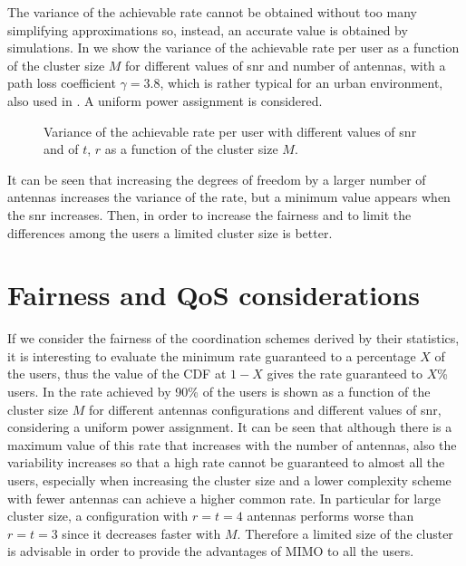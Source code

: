 The variance of the achievable rate cannot be obtained without too many simplifying approximations so, instead, an accurate value is obtained by simulations. In  we show the variance of the achievable rate per user as a function of the cluster size $M$ for different values of \gls{snr} and number of antennas, with a path loss coefficient $\gamma=3.8$, which is rather typical for an urban environment, also used in \cite{karakayali06}. A uniform power assignment is considered. 
\begin{figure}[t]
\begin{center}
\begin{small}
\end{small}
\end{center}
\vspace*{-2.2mm}\caption{Variance of the achievable rate per user with different values of \gls{snr} and of $t$, $r$ as a function of the cluster size $M$.}\label{Varianza}
\end{figure}
It can be seen that increasing the degrees of freedom by a larger number of antennas increases the variance of the rate, but a minimum value appears when the \gls{snr} increases. Then, in order to increase the fairness and to limit the differences among the users a limited cluster size is better.

\section{Fairness and QoS considerations}

If we consider the fairness of the coordination schemes derived by their statistics, it is interesting to evaluate the minimum rate guaranteed to a percentage $X$ of the users, thus the value of the CDF at $1-X$ gives the rate guaranteed to $X$\% users.
In  the rate achieved by 90\% of the users is shown as a function of the cluster size $M$ for different antennas configurations and different values of \gls{snr}, considering a uniform power assignment. It can be seen that although there is a maximum value of this rate that increases with the number of antennas, also the variability increases so that a high rate cannot be guaranteed to almost all the users, especially when increasing the cluster size and a lower complexity scheme with fewer antennas can achieve a higher common rate. In particular for large cluster size, a configuration with $r=t=4$ antennas performs worse than $r=t=3$ since it decreases faster with $M$. Therefore a limited size of the cluster is advisable in order to provide the advantages of MIMO to all the users.

